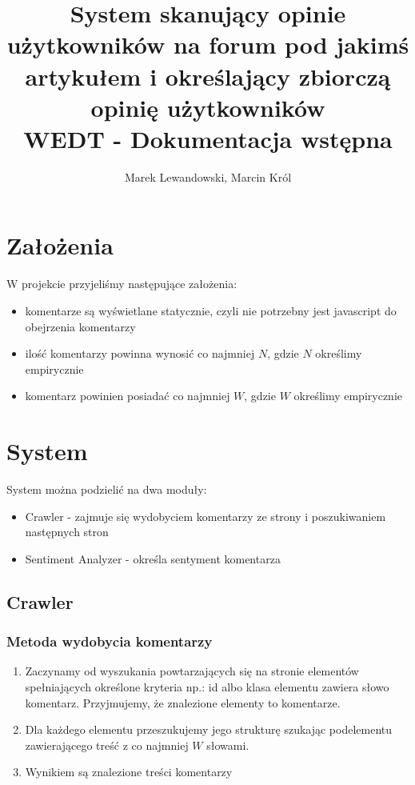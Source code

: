 \documentclass[12pt, a4paper]{article}
\author{Marek Lewandowski, Marcin Król}
\date{}
\title{System skanujący opinie użytkowników na forum pod jakimś artykułem i określający zbiorczą opinię użytkowników \\ 
        WEDT - Dokumentacja wstępna}
\begin{document}
\maketitle

\section{Założenia}
W projekcie przyjeliśmy następujące założenia:

\begin{itemize}
\item komentarze są wyświetlane statycznie, czyli nie potrzebny jest javascript do obejrzenia komentarzy
\item ilość komentarzy powinna wynosić co najmniej $N$, gdzie $N$ określimy empirycznie
\item komentarz powinien posiadać co najmniej $W$, gdzie $W$ określimy empirycznie
\end{itemize}

\section{System}

System można podzielić na dwa moduły:
\begin{itemize}
\item Crawler  - zajmuje się wydobyciem komentarzy ze strony i poszukiwaniem następnych stron
\item Sentiment Analyzer - określa sentyment komentarza
\end{itemize}

\subsection{Crawler}

\subsubsection{Metoda wydobycia komentarzy}
\begin{enumerate}
\item Zaczynamy od wyszukania powtarzających się na stronie elementów spełniających określone kryteria np.: id albo klasa elementu zawiera słowo komentarz. Przyjmujemy, że znalezione elementy to komentarze.
\item Dla każdego elementu przeszukujemy jego strukturę szukając podelementu zawierającego treść z co najmniej $W$ słowami.
\item Wynikiem są znalezione treści komentarzy
\end{enumerate}
\end{document}
